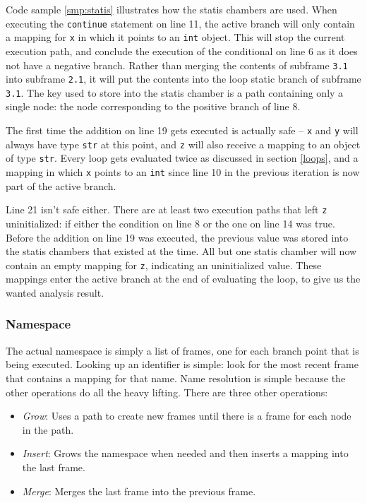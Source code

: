\documentclass[a4paper, 16pt, oneside]{Thesis}
\providecommand{\tightlist}{%
  \setlength{\itemsep}{0pt}\setlength{\parskip}{0pt}}
\begin{document}
Code sample \ref{smp:statis} illustrates how the statis chambers are
used. When executing the \texttt{continue} statement on line 11, the
active branch will only contain a mapping for \texttt{x} in which it
points to an \texttt{int} object. This will stop the current execution
path, and conclude the execution of the conditional on line 6 as it does
not have a negative branch. Rather than merging the contents of subframe
\texttt{3.1} into subframe \texttt{2.1}, it will put the contents into
the loop static branch of subframe \texttt{3.1}. The key used to store
into the statis chamber is a path containing only a single node: the
node corresponding to the positive branch of line 8.

The first time the addition on line 19 gets executed is actually safe --
\texttt{x} and \texttt{y} will always have type \texttt{str} at this
point, and \texttt{z} will also receive a mapping to an object of type
\texttt{str}. Every loop gets evaluated twice as discussed in section
\ref{loops}, and a mapping in which \texttt{x} points to an \texttt{int}
since line 10 in the previous iteration is now part of the active
branch.

Line 21 isn't safe either. There are at least two execution paths that
left \texttt{z} uninitialized: if either the condition on line 8 or the
one on line 14 was true. Before the addition on line 19 was executed,
the previous value was stored into the statis chambers that existed at
the time. All but one statis chamber will now contain an empty mapping
for \texttt{z}, indicating an uninitialized value. These mappings enter
the active branch at the end of evaluating the loop, to give us the
wanted analysis result.

\subsubsection{Namespace}\label{namespace-1}

The actual namespace is simply a list of frames, one for each branch
point that is being executed. Looking up an identifier is simple: look
for the most recent frame that contains a mapping for that name. Name
resolution is simple because the other operations do all the heavy
lifting. There are three other operations:

\begin{itemize}
\tightlist
\item
  \textit{Grow}: Uses a path to create new frames until there is a frame
  for each node in the path.
\item
  \textit{Insert}: Grows the namespace when needed and then inserts a
  mapping into the last frame.
\item
  \textit{Merge}: Merges the last frame into the previous frame.
\end{itemize}
\end{document}
